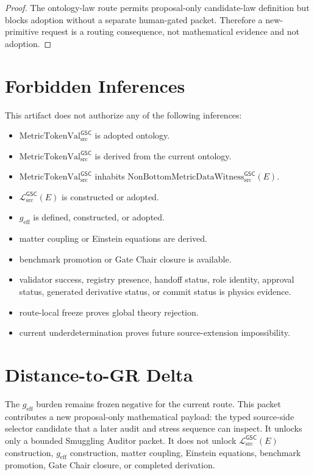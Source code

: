 \documentclass[11pt]{article}
\newcommand{\MetricTokenVal}{\mathrm{MetricTokenVal}_{\mathrm{src}}^{\mathsf{GSC}}}
\newcommand{\Witness}{\mathrm{NonBottomMetricDataWitness}_{\mathrm{src}}^{\mathsf{GSC}}}
\newcommand{\MetricData}{\mathcal{L}_{\mathrm{src}}^{\mathsf{GSC}}}
\newcommand{\geff}{g_{\mathrm{eff}}}
\begin{document}
\begin{proof}
The ontology-law route permits proposal-only candidate-law definition but
blocks adoption without a separate human-gated packet. Therefore a
new-primitive request is a routing consequence, not mathematical evidence and
not adoption.
\end{proof}

\section{Forbidden Inferences}

This artifact does not authorize any of the following inferences:
\begin{itemize}[leftmargin=*]
  \item \(\MetricTokenVal\) is adopted ontology.
  \item \(\MetricTokenVal\) is derived from the current ontology.
  \item \(\MetricTokenVal\) inhabits \(\Witness(E)\).
  \item \(\MetricData(E)\) is constructed or adopted.
  \item \(\geff\) is defined, constructed, or adopted.
  \item matter coupling or Einstein equations are derived.
  \item benchmark promotion or Gate Chair closure is available.
  \item validator success, registry presence, handoff status, role identity,
  approval status, generated derivative status, or commit status is physics
  evidence.
  \item route-local freeze proves global theory rejection.
  \item current underdetermination proves future source-extension
  impossibility.
\end{itemize}

\section{Distance-to-GR Delta}

The \(\geff\) burden remains \(\mathrm{frozen\ negative}\) for the current
route. This packet contributes a new proposal-only mathematical payload: the
typed source-side selector candidate that a later audit and stress sequence
can inspect. It unlocks only a bounded Smuggling Auditor packet. It does not
unlock \(\MetricData(E)\) construction, \(\geff\) construction, matter
coupling, Einstein equations, benchmark promotion, Gate Chair closure, or
completed derivation.
\end{document}
